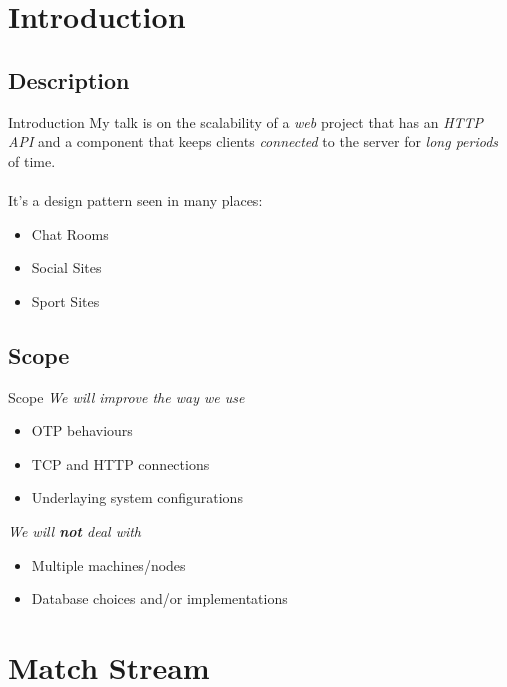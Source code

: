 \documentclass[utf8]{beamer}
\begin{document}
\section{Introduction}
\subsection{Description}
\begin{frame}{Introduction}
	My talk is on the scalability of a \emph{web} project \pause that has an \emph{HTTP API} \pause and a component that keeps clients \emph{connected} to the server for \emph{long periods} of time.\\ ~ \\ \pause
	It's a design pattern seen in many places:
	\begin{itemize}
		\item Chat Rooms
		\item Social Sites
		\item Sport Sites
	\end{itemize}
\end{frame}

\subsection{Scope}
\begin{frame}{Scope}
	\emph{We will improve the way we use}
	\begin{itemize}
		\item OTP behaviours
		\item TCP and HTTP connections
		\item Underlaying system configurations
	\end{itemize}
	\pause
	\emph{We will \textbf{not} deal with}
	\begin{itemize}
		\item Multiple machines/nodes
		\item Database choices and/or implementations
	\end{itemize}
\end{frame}

\section{Match Stream}
\end{document}
